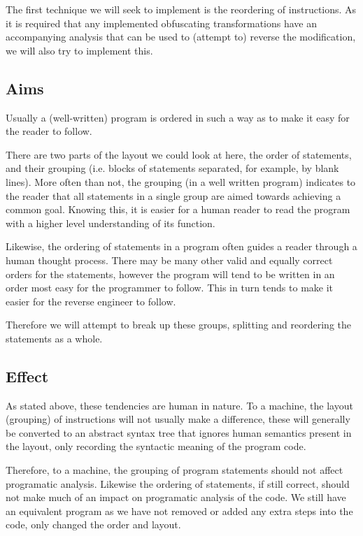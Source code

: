 \documentclass{report}
\begin{document}
The first technique we will seek to implement is the reordering of instructions. As it is required that
any implemented obfuscating transformations have an accompanying analysis that can be used to (attempt to)
reverse the modification, we will also try to implement this.

\subsection{Aims}

Usually a (well-written) program is ordered in such a way as to make it easy for the reader to follow.

There are two parts of the layout we could look at here, the order of statements, and their grouping (i.e. blocks of statements
separated, for example, by blank lines). More often than not, the grouping (in a well written program) indicates
to the reader that all statements in a single group are aimed towards achieving a common goal.
Knowing this, it is easier for a human reader to read the program with a higher level understanding
of its function.

Likewise, the ordering of statements in a program often guides a reader through a human thought process. There may
be many other valid and equally correct orders for the statements, however the program will tend to be written in
an order most easy for the programmer to follow. This in turn tends to make it easier for the reverse engineer to follow.

Therefore we will attempt to break up these groups, splitting and reordering the statements as a whole.

\subsection{Effect}

As stated above, these tendencies are human in nature. To a machine, the layout (grouping) of instructions will not usually
make a difference, these will generally be converted to an abstract syntax tree that ignores human semantics present in the
layout, only recording the syntactic meaning of the program code.

Therefore, to a machine, the grouping of program statements should not affect programatic analysis. Likewise the ordering of
statements, if still correct, should not make much of an impact on programatic analysis of the code. We still have an
equivalent program as we have not removed or added any extra steps into the code, only changed the order and layout.
\end{document}
